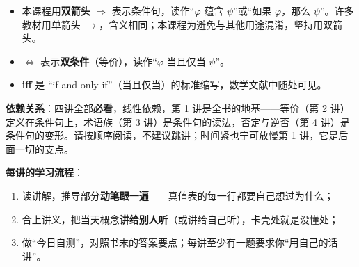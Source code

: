 \documentclass[UTF8,a4paper,11pt]{ctexart}
\begin{document}
\begin{calcbox}
\begin{itemize}
  \item 本课程用\textbf{双箭头} $\Rightarrow$ 表示条件句，读作“$\varphi$ 蕴含 $\psi$”或“如果 $\varphi$，那么 $\psi$”。许多教材用单箭头 $\rightarrow$，含义相同；本课程为避免与其他用途混淆，坚持用双箭头。
  \item $\Leftrightarrow$ 表示\textbf{双条件}（等价），读作“$\varphi$ 当且仅当 $\psi$”。
  \item \textbf{iff} 是 “if and only if”（当且仅当）的标准缩写，数学文献中随处可见。
\end{itemize}
\end{calcbox}

\begin{center}
\end{center}

\noindent\textbf{依赖关系}：四讲全部\textbf{必看}，线性依赖，第 1 讲是全书的地基——等价（第 2 讲）定义在条件句上，术语族（第 3 讲）是条件句的读法，否定与逆否（第 4 讲）是条件句的变形。请按顺序阅读，不建议跳讲；时间紧也宁可放慢第 1 讲，它是后面一切的支点。

\textbf{每讲的学习流程}：
\begin{enumerate}
  \item 读讲解，推导部分\textbf{动笔跟一遍}——真值表的每一行都要自己想过为什么；
  \item 合上讲义，把当天概念\textbf{讲给别人听}（或讲给自己听），卡壳处就是没懂处；
  \item 做“今日自测”，对照书末的答案要点；每讲至少有一题要求你“用自己的话讲”。
\end{enumerate}
\end{document}
